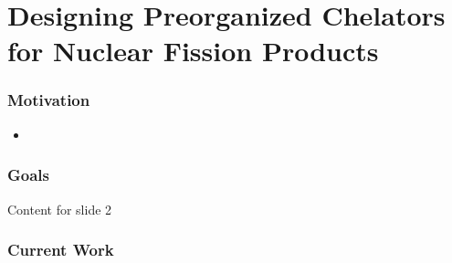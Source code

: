\section{Designing Preorganized Chelators for Nuclear Fission Products}

\begin{frame}
\frametitle{Motivation}
\begin{itemize}
	\item 
\end{itemize}
\end{frame}


\begin{frame}
\frametitle{Goals}
Content for slide 2
\end{frame}


\begin{frame}
\frametitle{Current Work}
\end{frame}
